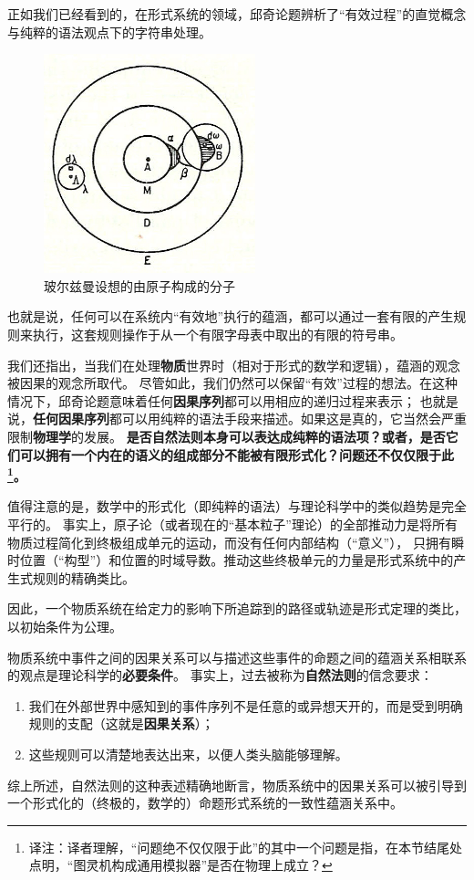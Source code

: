 \documentclass[a4paper,12pt]{article}
\begin{document}
正如我们已经看到的，在形式系统的领域，邱奇论题辨析了“有效过程”的直觉概念与纯粹的语法观点下的字符串处理。

\begin{figure}[ht]
\centering
\includegraphics[height=2.5in]{images/boltzmanns_molecule.jpg}
\caption{玻尔兹曼设想的由原子构成的分子}
\end{figure}

也就是说，任何可以在系统内“有效地”执行的蕴涵，都可以通过一套有限的产生规则来执行，这套规则操作于从一个有限字母表中取出的有限的符号串。

我们还指出，当我们在处理\textbf{物质}世界时（相对于形式的数学和逻辑），蕴涵的观念被因果的观念所取代。
尽管如此，我们仍然可以保留“有效”过程的想法。在这种情况下，邱奇论题意味着任何\textbf{因果序列}都可以用相应的递归过程来表示；
也就是说，\textbf{任何因果序列}都可以用纯粹的语法手段来描述。如果这是真的，它当然会严重限制\textbf{物理学}的发展。
\textbf{是否自然法则本身可以表达成纯粹的语法项？或者，是否它们可以拥有一个内在的语义的组成部分不能被有限形式化？问题还不仅仅限于此\footnote[1]{
译注：译者理解，“问题绝不仅仅限于此”的其中一个问题是指，在本节结尾处点明，“图灵机构成通用模拟器”是否在物理上成立？}。}

值得注意的是，数学中的形式化（即纯粹的语法）与理论科学中的类似趋势是完全平行的。
事实上，原子论（或者现在的“基本粒子”理论）的全部推动力是将所有物质过程简化到终极组成单元的运动，而没有任何内部结构（“意义”），
只拥有瞬时位置（“构型”）和位置的时域导数。推动这些终极单元的力量是形式系统中的产生式规则的精确类比。

因此，一个物质系统在给定力的影响下所追踪到的路径或轨迹是形式定理的类比，以初始条件为公理。

物质系统中事件之间的因果关系可以与描述这些事件的命题之间的蕴涵关系相联系的观点是理论科学的\textbf{必要条件}。
事实上，过去被称为\textbf{自然法则}的信念要求：
\begin{enumerate}[label=(\alph*)]
\item 我们在外部世界中感知到的事件序列不是任意的或异想天开的，而是受到明确规则的支配（这就是\textbf{因果关系}）；
\item 这些规则可以清楚地表达出来，以便人类头脑能够理解。
\end{enumerate}
综上所述，自然法则的这种表述精确地断言，物质系统中的因果关系可以被引导到一个形式化的（终极的，数学的）命题形式系统的一致性蕴涵关系中。
\end{document}
